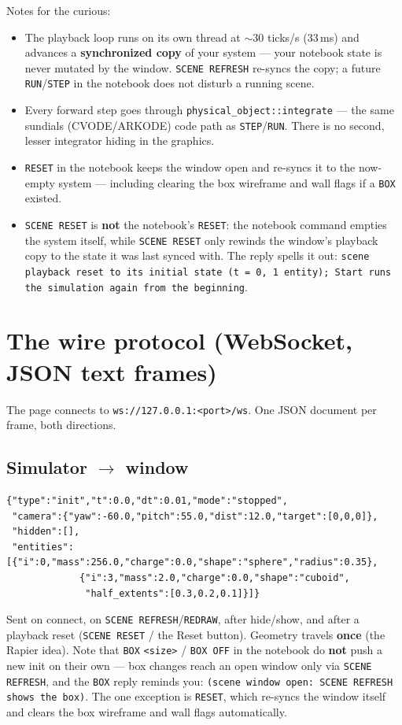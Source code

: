 \documentclass[11pt]{article}
\newcommand{\kw}[1]{\texttt{\uppercase{#1}}}
\newcommand{\code}[1]{\texttt{#1}}
\begin{document}
Notes for the curious:
\begin{itemize}
\item The playback loop runs on its own thread at $\sim$30 ticks/s
      (33\,ms) and advances a \textbf{synchronized copy} of your
      system --- your notebook state is never mutated by the window.
      \kw{scene refresh} re-syncs the copy; a future
      \kw{run}/\kw{step} in the notebook does not disturb a running
      scene.
\item Every forward step goes through
      \code{physical\_object::integrate} --- the same sundials
      (CVODE/ARKODE) code path as \kw{step}/\kw{run}. There is no
      second, lesser integrator hiding in the graphics.
\item \kw{reset} in the notebook keeps the window open and re-syncs
      it to the now-empty system --- including clearing the box
      wireframe and wall flags if a \kw{box} existed.
\item \kw{scene reset} is \textbf{not} the notebook's \kw{reset}:
      the notebook command empties the system itself, while
      \kw{scene reset} only rewinds the window's playback copy to the
      state it was last synced with. The reply spells it out:
      \code{scene playback reset to its initial state (t = 0, 1
      entity); Start runs the simulation again from the beginning}.
\end{itemize}

\section{The wire protocol (WebSocket, JSON text frames)}

The page connects to \code{ws://127.0.0.1:<port>/ws}. One JSON
document per frame, both directions.

\subsection{Simulator $\to$ window}

\begin{lstlisting}
{"type":"init","t":0.0,"dt":0.01,"mode":"stopped",
 "camera":{"yaw":-60.0,"pitch":55.0,"dist":12.0,"target":[0,0,0]},
 "hidden":[],
 "entities":[{"i":0,"mass":256.0,"charge":0.0,"shape":"sphere","radius":0.35},
             {"i":3,"mass":2.0,"charge":0.0,"shape":"cuboid",
              "half_extents":[0.3,0.2,0.1]}]}
\end{lstlisting}
Sent on connect, on \kw{scene refresh}/\kw{redraw}, after hide/show,
and after a playback reset (\kw{scene reset} / the Reset button).
Geometry travels \textbf{once} (the Rapier idea). Note
that \kw{box} \code{<size>} / \kw{box off} in the notebook do
\textbf{not} push a new init on their own --- box changes reach an
open window only via \kw{scene refresh}, and the \kw{box} reply
reminds you: \code{(scene window open: SCENE REFRESH shows the box)}.
The one exception is \kw{reset}, which re-syncs the window itself and
clears the box wireframe and wall flags automatically.
\end{document}
